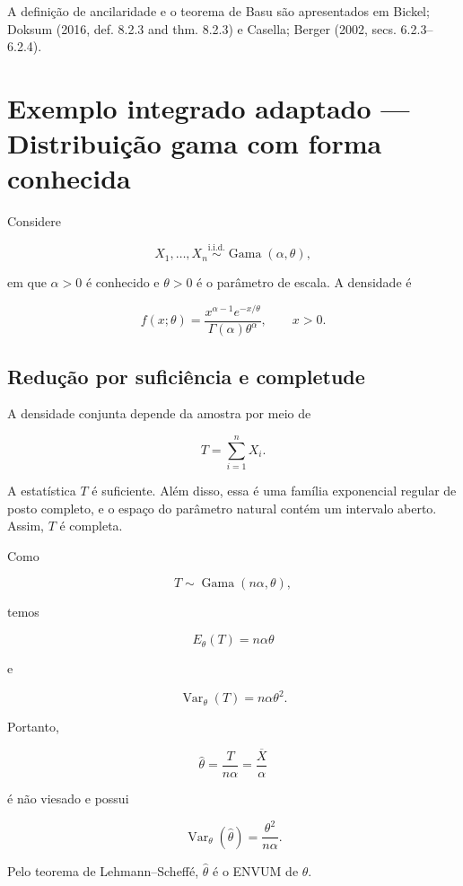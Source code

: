 \documentclass[
  letterpaper,
  DIV=11,
  numbers=noendperiod]{scrreprt}
\begin{document}
A definição de ancilaridade e o teorema de Basu são apresentados em
Bickel; Doksum (2016, def. 8.2.3 and thm. 8.2.3) e Casella; Berger
(2002, secs. 6.2.3--6.2.4).

\section{Exemplo integrado adaptado --- Distribuição gama com forma
conhecida}\label{exemplo-integrado-adaptado-distribuiuxe7uxe3o-gama-com-forma-conhecida}

Considere

\[X_1,\ldots,X_n
\overset{\mathrm{i.i.d.}}{\sim}
\operatorname{Gama}(\alpha,\theta),\]

em que \(\alpha>0\) é conhecido e \(\theta>0\) é o parâmetro de escala.
A densidade é

\[f(x;\theta)
=
\frac{x^{\alpha-1}e^{-x/\theta}}
{\Gamma(\alpha)\theta^\alpha},
\qquad x>0.\]

\subsection*{Redução por suficiência e
completude}\label{reduuxe7uxe3o-por-suficiuxeancia-e-completude}

A densidade conjunta depende da amostra por meio de

\[T=\sum_{i=1}^nX_i.\]

A estatística \(T\) é suficiente. Além disso, essa é uma família
exponencial regular de posto completo, e o espaço do parâmetro natural
contém um intervalo aberto. Assim, \(T\) é completa.

Como

\[T\sim\operatorname{Gama}(n\alpha,\theta),\]

temos

\[E_\theta(T)=n\alpha\theta\]

e

\[\operatorname{Var}_\theta(T)=n\alpha\theta^2.\]

Portanto,

\[\widehat{\theta}
=
\frac{T}{n\alpha}
=
\frac{\overline{X}}{\alpha}\]

é não viesado e possui

\[\operatorname{Var}_\theta(\widehat{\theta})
=
\frac{\theta^2}{n\alpha}.\]

Pelo teorema de Lehmann--Scheffé, \(\widehat{\theta}\) é o ENVUM de
\(\theta\).
\end{document}

